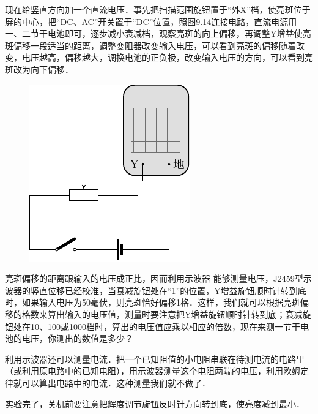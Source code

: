 现在给竖直方向加一个直流电压．事先把扫描范围旋钮置于“外X”档，使亮斑位于屏的中心，把“DC、AC”开关置于“DC”位置，照图9.14连接电路，直流电源用一、二节干电池即可，逐步减小衰减档，观察亮斑的向上偏移，再调整Y增益使亮斑偏移一段适当的距离，调整变阻器改变输入电压，可以看到亮斑的偏移随着改变，电压越高，偏移越大，调换电池的正负极，改变输入电压的方向，可以看到亮斑改为向下偏移．
\begin{figure}[htbp]
    \centering
    \includegraphics{fig/B/9-14.pdf}
    \caption{}\label{fig_B_9-14}
\end{figure}

亮斑偏移的距离跟输入的电压成正比，因而利用示波器
能够测量电压，J2459型示波器的竖直位移已经校准，当衰减旋钮处在“1”的位置，Y增益旋钮顺时针转到底时，如果输入电压为50毫伏，则亮斑恰好偏移1格．这样，我们就可以根据亮斑偏移的格数来算出输入的电压值，测量时要注意把Y增益旋钮顺时针转到底；衰减旋钮处在10、100或1000档时，算出的电压值应乘以相应的倍数，现在来测一节干电池的电压，你测出的数值是多少？

利用示波器还可以测量电流．把一个已知阻值的小电阻串联在待测电流的电路里（或利用原电路中的已知电阻），用示波器测量这个电阻两端的电压，利用欧姆定律就可以算出电路中的电流．这种测量我们就不做了．

实验完了，关机前要注意把辉度调节旋钮反时针方向转到底，使亮度减到最小．

